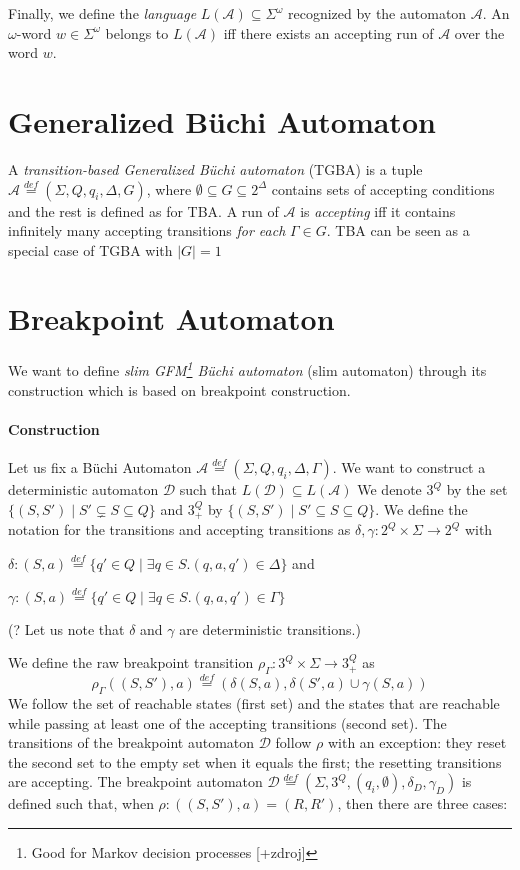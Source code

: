\documentclass[
	digital
nolof, nolot
]{fithesis3}
\newcommand{\cA}{\mathcal{A}}
\newcommand{\cD}{\mathcal{D}}
\newcommand{\lA}{L(\cA)}
\newcommand{\lD}{L(\cD)}
\newcommand{\eqdef}{\overset{def}{=}}
\begin{document}
			Finally, we define the \emph{language} $\lA \subseteq \Sigma^\omega$ recognized by the automaton $\cA$. An $\omega$-word $w \in \Sigma^\omega$ belongs to $\lA$ iff there exists an accepting run of $\cA$ over the word $w$. 
			
		\section{Generalized Büchi Automaton}
		A \emph{transition-based Generalized Büchi automaton} (TGBA) is a tuple $\cA\eqdef(\Sigma, Q, q_i, \Delta, G)$, where $\emptyset \subseteq G \subseteq 2^\Delta$ contains sets of accepting conditions and the rest is defined as for TBA. A run of $\cA$ is \emph{accepting} iff it contains infinitely many accepting transitions \emph{for each} $\Gamma \in G$. TBA can be seen as a special case of TGBA with $|G|=1$
		
		\section{Breakpoint Automaton}
			We want to define \emph{slim GFM\footnote{Good for Markov decision processes [+zdroj]} Büchi automaton} (slim automaton) through its construction which is based on breakpoint construction. 
			\paragraph{Construction}
			Let us fix a Büchi Automaton $\cA\eqdef(\Sigma, Q, q_i, \Delta, \Gamma)$. 
			We want to construct a deterministic automaton $\cD$ such that $\lD\subseteq \lA$ 
			We denote $3^Q$ by the set $\{(S,S') \mid S'\subsetneq S \subseteq Q\}$ and
			$3^Q_+$ by $\{(S,S') \mid S'\subseteq S \subseteq Q\}$.
			We define the notation for the transitions and accepting transitions as $\delta,\gamma:2^Q \times \Sigma \rightarrow 2^Q$ with
			
			$\delta: (S,a)\eqdef\{q'\in Q \mid \exists q \in S.(q,a,q') \in \Delta\}$ and
			
			$\gamma: (S,a)\eqdef\{q'\in Q \mid \exists q \in S.(q,a,q') \in \Gamma\}$
			
			(? Let us note that $\delta$ and $\gamma$ are deterministic transitions.)
			
			We define the raw breakpoint transition
			$\rho_\Gamma \colon 3^Q \times \Sigma \rightarrow 3^Q_+$ as
			\[\rho_\Gamma((S, S'), a) \eqdef(\delta(S, a), \delta(S',a)\cup \gamma(S, a))\]
			We follow the set of reachable states (first set) and the states that are reachable while passing at least one of the accepting transitions (second set).
			The transitions of the breakpoint automaton $\cD$ follow $\rho$ with an exception: they reset the second set to the empty set when it equals the first; the resetting transitions are accepting.
			The breakpoint automaton $\cD \eqdef (\Sigma, 3^Q, (q_i, \emptyset), \delta_D, \gamma_D)$ is defined such that, when $\rho\colon ((S, S'), a) = (R, R')$, then there are three cases:
			
\end{document}
